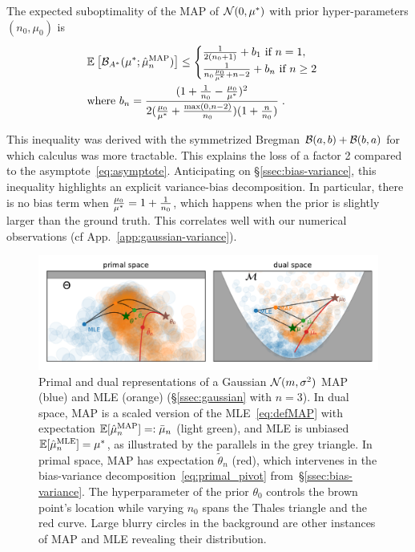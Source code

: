 \documentclass[twoside]{article}
\newcommand*{\expect}[2][]{\ensuremath{\mathbb{E}_{#1} \left[ #2 \right] }} %
\newcommand{\logpart}{A}
\newcommand{\bregmanconj}{\cB_{\logpart^*}}
\newcommand{\nat}{\theta}
\newcommand{\m}{\mu}
\begin{document}
\begin{theorem}
\label{thm:varianceMAP}
The expected suboptimality of the MAP of $\cN(0,\m^*)$ with prior hyper-parameters $(n_0,\m_0)$ is
 \begin{align}
	& \expect{\bregmanconj( \m^*; \hat \m_n^\mathrm{MAP})}
	\leq \begin{cases}
		\inv{2(n_0+1)}  +  b_1 \ \text{if}\ n=1,\\
		\frac{1}{n_0 \frac{\m_0}{\m^*} +n-2} + b_n \ \text{if}\ n\geq 2
	\end{cases}
	\label{eq:MAP_rate}\\
	& \text{where }b_n = \frac{(1 + \inv{n_0} - \frac{\m_0}{\m^*})^2}{2 (\frac{\m_0}{\m^*}+\frac{\max(0,n-2)}{n_0})(1 + \frac{n}{n_0} )} \; . \nonumber
\end{align}
\end{theorem}
This inequality was derived with the symmetrized Bregman ${\mathcal B}(a,b) + {\mathcal B}(b,a)$ for which calculus was more tractable.
This explains the loss of a factor 2 compared to the asymptote~\eqref{eq:asymptote}.
Anticipating on \S\ref{ssec:bias-variance}, this inequality highlights an explicit variance-bias decomposition.
In particular, there is no bias term when $\frac{\m_0}{\m^*} =1 + \inv{n_0} $, which happens when the prior is slightly larger than the ground truth.
This correlates well with our numerical observations (cf App.~\ref{app:gaussian-variance}).

\begin{figure}[t]
	\centering
	\includegraphics[width=.8\textwidth]{figs/thales/numerical_schema_n=3.pdf}
	\caption{
	Primal and dual representations of a Gaussian ${\mathcal N}(m,\sigma^2)$ MAP (blue) and MLE (orange) (\S\ref{ssec:gaussian} with $n=3$).
	In dual space, MAP is a scaled version of the MLE~\eqref{eq:defMAP} with expectation $\E[\hat\m_n^\text{MAP}]=:\bar \m_n$ (light green), and MLE is unbiased $\E[\hat\m_n^\text{MLE}]=\m^*$, as illustrated by the parallels in the grey triangle.
	In primal space, MAP has expectation $\tilde \nat_n$ (red), which intervenes in the bias-variance decomposition~\eqref{eq:primal_pivot} from~\S\ref{ssec:bias-variance}.
	The hyperparameter of the prior $\nat_0$ controls the brown point's location while varying $n_0$ spans the Thales triangle and the red curve.
	Large blurry circles in the background are other instances of MAP and MLE revealing their distribution.
	}
	\label{fig:thales}
\end{figure}
\end{document}
